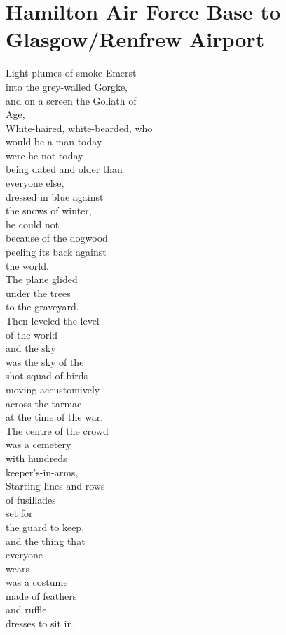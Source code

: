 \documentclass[smalldemyvopaper,11pt,twoside,onecolumn,openright,extrafontsizes]{memoir}
\begin{document}
\chapter{Hamilton Air Force Base to Glasgow/Renfrew Airport}
Light plumes of smoke Emerst
\\into the grey-walled Gorgke,
\\and on a screen the Goliath of
\\Age,
\\White-haired, white-bearded, who
\\would be a man today
\\were he not today
\\being dated and older than
\\everyone else,
\\dressed in blue against
\\the snows of winter,
\\he could not
\\because of the dogwood
\\peeling its back against
\\the world.
\\The plane glided
\\under the trees
\\to the graveyard.
\\Then leveled the level
\\of the world
\\and the sky
\\was the sky of the
\\shot-squad of birds
\\moving accustomively
\\across the tarmac
\\at the time of the war.
\\The centre of the crowd
\\was a cemetery
\\with hundreds
\\keeper's-in-arms,
\\Starting lines and rows
\\of fusillades
\\set for
\\the guard to keep,
\\and the thing that
\\everyone
\\wears
\\was a costume
\\made of feathers
\\and ruffle
\\dresses to sit in,
\end{document}
